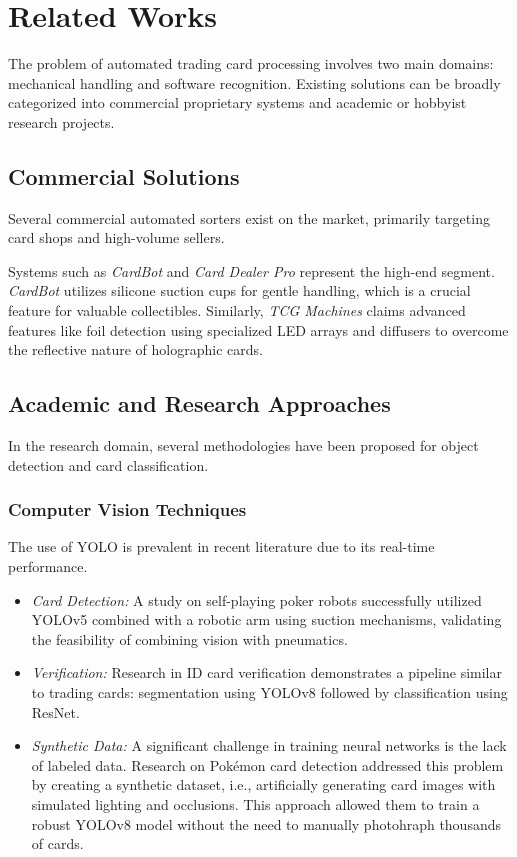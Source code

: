 \section{Related Works}

The problem of automated trading card processing involves two main domains: mechanical handling and software 
recognition. Existing solutions can be broadly categorized into commercial proprietary systems and academic or hobbyist 
research projects.

\subsection{Commercial Solutions}

Several commercial automated sorters exist on the market, primarily targeting card shops and high-volume sellers.

Systems such as \textit{CardBot} \cite{cardbot} and \textit{Card Dealer Pro} \cite{carddealerpro} represent the high-end 
segment. \textit{CardBot} utilizes silicone suction cups for gentle handling, which is a crucial feature for valuable 
collectibles. Similarly, \textit{TCG Machines} \cite{tcgmachines} claims advanced features like foil detection using 
specialized LED arrays and diffusers to overcome the reflective nature of holographic cards.

\subsection{Academic and Research Approaches}

In the research domain, several methodologies have been proposed for object detection and card classification.

\subsubsection{Computer Vision Techniques}
The use of \ac{YOLO} is prevalent in recent literature due to its real-time performance.
\begin{itemize}
    \item \textit{Card Detection:} A study on self-playing poker robots \cite{pokerrobot} successfully utilized 
    \ac{YOLO}v5 combined with a robotic arm using suction mechanisms, validating the feasibility of combining vision 
    with pneumatics.
    \item \textit{Verification:} Research in ID card verification \cite{idcardverification} demonstrates a pipeline 
    similar to trading cards: segmentation using \ac{YOLO}v8 followed by classification using \ac{ResNet}.
    \item \textit{Synthetic Data:} A significant challenge in training neural networks is the lack of labeled data. 
    Research on Pokémon card detection \cite{pokemonstanford} addressed this problem by creating a synthetic dataset, 
    i.e., artificially generating card images with simulated lighting and occlusions. This approach allowed them to 
    train a robust \ac{YOLO}v8 model without the need to manually photohraph thousands of cards.
\end{itemize}

